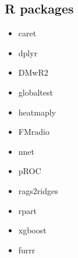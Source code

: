 \subsection{R packages} \label{packages}
\hspace{5 pt}
\begin{multicols}{3}
\begin{itemize}
    \item[] \textsf{caret} \cite{Kuhn2008BuildingPackage}
    \item[]\textsf{dplyr} \cite{dplyr}
    \item[]\textsf{DMwR2} \cite{DMwR2}
    \item[]\textsf{globaltest} \cite{Goeman2004AOutcome, Goeman2006TestingAlternative, Goeman2023ThePackage}
    \item[]\textsf{heatmaply} \cite{heatmaply}
    \item[]\textsf{FMradio} \cite{Peeters2019StableData}
    \item[]\textsf{nnet} \cite{nnet}
    \item[]\textsf{pROC} \cite{pROC}
    \item[]\textsf{rags2ridges} \cite{Peeters2022Rags2ridges:Matrices}
    \item[]\textsf{rpart} \cite{rpart}
    \item[]\textsf{xgboost} \cite{Chen2016XGBoost:System}
    \item[]\textsf{furrr} \cite{furrr}
\end{itemize}
\end{multicols}